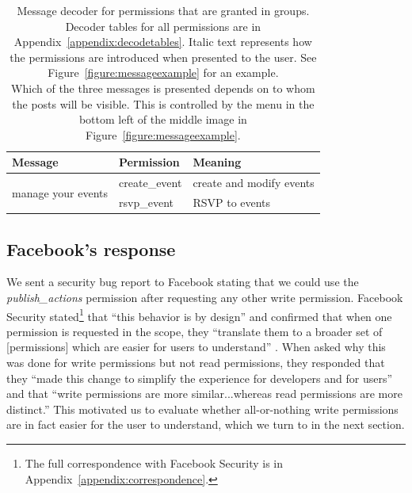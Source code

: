 \documentclass[10pt]{sig-alternate-10pt}
\begin{document}
\begin{table}[htb]
\begin{tabular}{|l|l|l|}
    \textbf{Message}                                                                                                                                                                                                                                                 & \textbf{Permission} & \textbf{Meaning}                                                                                                                          \\ \hline
    \multirow{2}{*}{manage your events}                                                                                                                                                                                                                              & create\_event       & create and modify events                                                                                                                  \\ \cline{2-3} 
    & rsvp\_event         & RSVP to events                                                                                                                            \\ \hline
  \end{tabular}
  \caption{Message decoder for permissions that are granted in groups. Decoder tables for all permissions are in Appendix~\ref{appendix:decodetables}. Italic text represents how the permissions are introduced when presented to the user. See Figure~\ref{figure:messageexample} for an example. \\ \footnotesize *Which of the three messages is presented depends on to whom the posts will be visible. This is controlled by the menu in the bottom left of the middle image in Figure~\ref{figure:messageexample}.}
  \label{table:messagegrouped}
\end{table}

\subsection{Facebook's response}
\label{sec:fbresponse}

We sent a security bug report to Facebook stating that we could use the \emph{publish\_actions} permission after requesting any other write permission. Facebook Security stated\footnote{The full correspondence with Facebook Security is in Appendix~\ref{appendix:correspondence}.} that ``this behavior is by design'' and confirmed that when one permission is requested in the scope, they ``translate them to a broader set of [permissions] which are easier for users to understand'' \cite{fbsecurity}. When asked why this was done for write permissions but not read permissions, they responded that they ``made this change to simplify the experience for developers and for users'' and that ``write permissions are more similar...whereas read permissions are more distinct.'' 
This motivated us to evaluate whether all-or-nothing write permissions are in fact easier for the user to understand, which we turn to in the next section.
\end{document}
